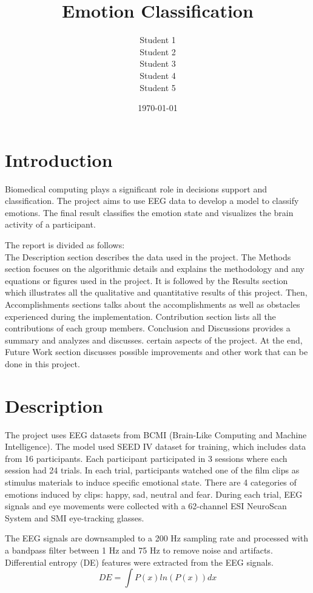 \documentclass[12pt, a4paper]{report}
\title{Emotion Classification}
\author{Student 1 \\ Student 2 \\ Student 3 \\ Student 4 \\ Student 5}
\date{\today}
\begin{document}
\maketitle
\tableofcontents
\newpage


\section{Introduction}
Biomedical computing plays a significant role in decisions support and classification. The project aims to use EEG data to develop a model to classify emotions. The final result classifies the emotion state and visualizes the brain activity of a participant. 

The report is divided as follows: \\ The Description section describes the data used in the project. The Methods section focuses on the algorithmic details and explains the methodology and any equations or figures used in the project. It is followed by the Results section which illustrates all the qualitative and quantitative results of this project. Then, Accomplishments sections talks about the accomplishments as well as obstacles experienced during the implementation. Contribution section lists all the contributions of each group members. Conclusion and Discussions provides a summary and analyzes and discusses. certain aspects of the project. At the end, Future Work section discusses possible improvements and other work that can be done in this project.


\section{Description}
The project uses EEG datasets from BCMI (Brain-Like Computing and Machine Intelligence). The model used SEED IV dataset for training, which includes data from 16 participants. Each participant participated in 3 sessions where each session had 24 trials. In each trial, participants watched one of the film clips as stimulus materials to induce specific emotional state. There are 4 categories of emotions induced by clips: happy, sad, neutral and fear. During each trial, EEG signals and eye movements were collected with a 62-channel ESI NeuroScan System and SMI eye-tracking glasses. 

The EEG signals are downsampled to a 200 Hz sampling rate and processed with a bandpass filter between 1 Hz and 75 Hz to remove noise and artifacts. Differential entropy (DE) features were extracted from the EEG signals.
\[DE = \int P(x) ln(P(x)) dx\]
\end{document}
